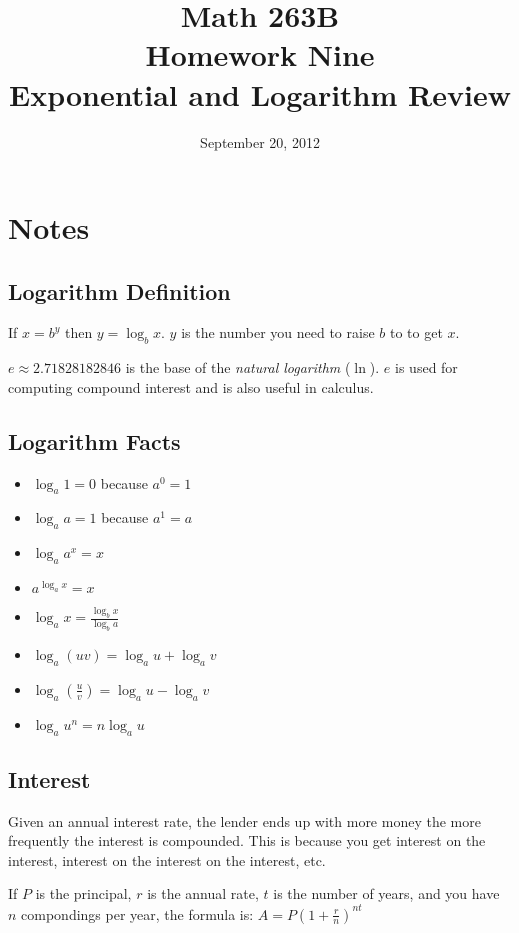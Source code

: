 \documentclass{exam}
\title{Math 263B \\ Homework Nine \\ Exponential and Logarithm Review}
\date{September 20, 2012}
\begin{document}
\maketitle

\ifprintanswers
\else

\section{Notes}

\subsection{Logarithm Definition}

If $x = b^y$ then $y = \log_b x$.  $y$ is the number you need to raise $b$ to to get $x$.

$e \approx 2.71828182846$ is the base of the {\em natural logarithm} ($\ln$).  $e$ is used for  computing compound interest and
is also useful in calculus.

\subsection{Logarithm Facts}

\begin{itemize}
  \item $\log_a 1 = 0$ because $a^0 = 1$
  \item $\log_a a = 1$ because $a^1 = a$
  \item $\log_a a^x = x$ 
  \item $a^{\log_a x} = x$ 
  \item $\log_a x = \frac{\log_b x}{\log_b a}$
  \item $\log_a (uv) = \log_a u + \log_a v$
  \item $\log_a \left(\frac{u}{v} \right) = \log_a u - \log_a v$
  \item $\log_a u^n = n \log_a u$
\end{itemize}

\subsection{Interest}
Given an annual interest rate, the lender ends up with more money the more frequently the interest is compounded.  This is
because you get interest on the interest, interest on the interest on the interest, etc.

If $P$ is the principal, $r$ is the annual rate, $t$ is the number of years, and you have $n$ compondings per year, the 
formula is: $A = P\left( 1 + \frac{r}{n} \right)^{nt}$
\end{document}
